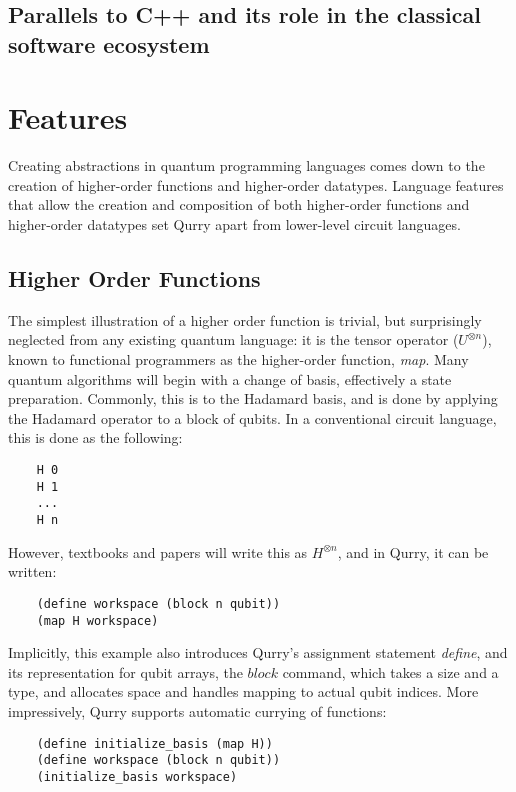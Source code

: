 \documentclass[a4paper,twocolumn,11pt,accepted=2017-05-09]{quantumarticle}
\begin{document}
\subsection{Parallels to C++ and its role in the classical software ecosystem}


\section{Features}

    Creating abstractions in quantum programming languages comes down to the creation of higher-order functions and higher-order datatypes.
    Language features that allow the creation and composition of both higher-order functions and higher-order datatypes set Qurry apart from lower-level circuit languages.

    \subsection{Higher Order Functions}

    The simplest illustration of a higher order function is trivial, but surprisingly neglected from any existing quantum language: it is the tensor operator ($U^{\otimes n}$), known to functional programmers as the higher-order function, \emph{map}.
    Many quantum algorithms will begin with a change of basis, effectively a state preparation. 
    Commonly, this is to the Hadamard basis, and is done by applying the Hadamard operator to a block of qubits.
    In a conventional circuit language, this is done as the following:
    \begin{verbatim}
    H 0
    H 1
    ...
    H n\end{verbatim}
    However, textbooks and papers will write this as $H^{\otimes n}$, and in Qurry, it can be written:
    \begin{verbatim}
    (define workspace (block n qubit))
    (map H workspace)\end{verbatim}
    Implicitly, this example also introduces Qurry's assignment statement \emph{define}, and its representation for qubit arrays, the $block$ command, which takes a size and a type, and allocates space and handles mapping to actual qubit indices.
    More impressively, Qurry supports automatic currying of functions:
    \begin{verbatim}
    (define initialize_basis (map H))
    (define workspace (block n qubit))
    (initialize_basis workspace)\end{verbatim}
\end{document}
